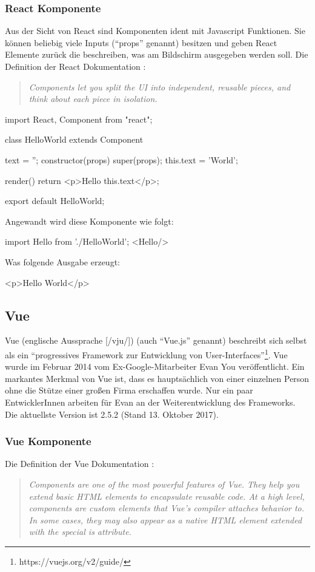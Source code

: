 \subsubsection{React Komponente}
Aus der Sicht von React sind Komponenten ident mit Javascript Funktionen. Sie können beliebig viele Inputs ("`props"' genannt) besitzen und geben React Elemente zurück die beschreiben, was am Bildschirm ausgegeben werden soll.
Die Definition der React Dokumentation \cite{react-component}: 
\begin{quote}
	\begin{english}
		\textit{Components let you split the UI into independent, reusable pieces, and think about each piece in isolation.}
	\end{english}
\end{quote}

\begin{JsCode}
	import React, {Component} from "react";
	
	class HelloWorld extends Component {
		text = '';
		constructor(props) {
			super(props);
			this.text = 'World';
		}
		
		render() {
			return <p>Hello {this.text}</p>;
		}
	}
	export default HelloWorld;
\end{JsCode}

Angewandt wird diese Komponente wie folgt:
\begin{JsCode}[numbers=none]
	import Hello from './HelloWorld';
	<Hello/>
\end{JsCode}
Was folgende Ausgabe erzeugt:
\begin{JsCode}Hello World</p>
\end{JsCode}

\subsection{Vue }
Vue (englische Aussprache [/vju/]) (auch "`Vue.js"' genannt) beschreibt sich selbst als ein "`progressives Framework zur Entwicklung von User-Interfaces"'\footnote{https://vuejs.org/v2/guide/}. Vue wurde im Februar 2014 vom Ex-Google-Mitarbeiter Evan You veröffentlicht. Ein markantes Merkmal von Vue ist, dass es hauptsächlich von einer einzelnen Person ohne die Stütze einer großen Firma erschaffen wurde. Nur ein paar EntwicklerInnen arbeiten für Evan an der Weiterentwicklung des Frameworks. Die aktuellste Version ist 2.5.2 (Stand 13. Oktober 2017).

\subsubsection{Vue Komponente}
Die Definition der Vue Dokumentation \cite{vue-component}: 
\begin{quote}
	\begin{english}
		\textit{Components are one of the most powerful features of Vue. They help you extend basic HTML elements to encapsulate reusable code. At a high level, components are custom elements that Vue’s compiler attaches behavior to. In some cases, they may also appear as a native HTML element extended with the special is attribute.}
	\end{english}
\end{quote}

